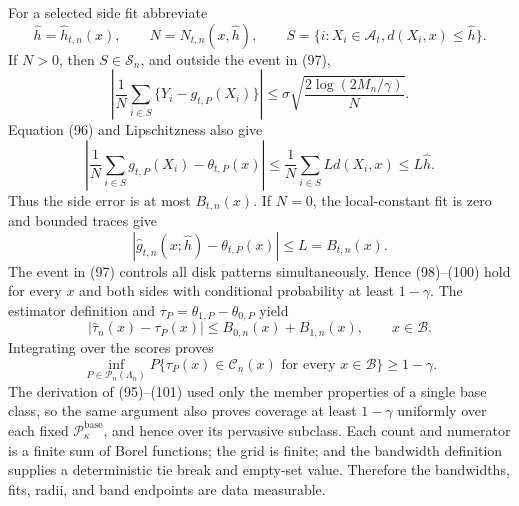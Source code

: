 For a selected side fit abbreviate
\[
 \widehat h=\widehat h_{t,n}(x),\qquad
 N=N_{t,n}(x,\widehat h),\qquad
 S=\{i:X_i\in\mathcal A_t, d(X_i,x)\le\widehat h\}.
\]
If \(N>0\), then \(S\in\mathscr S_n\), and outside the event in (97),
\[
 \left|\frac1N\sum_{i\in S}\{Y_i-g_{t,P}(X_i)\}\right|
 \le\sigma\sqrt{\frac{2\log(2M_n/\gamma)}N}.
 \tag{98}
\]
Equation (96) and Lipschitzness also give
\[
 \left|\frac1N\sum_{i\in S}g_{t,P}(X_i)-\theta_{t,P}(x)\right|
 \le\frac1N\sum_{i\in S}Ld(X_i,x)
 \le L\widehat h.
 \tag{99}
\]
Thus the side error is at most \(B_{t,n}(x)\).  If \(N=0\), the
local-constant fit is zero and bounded traces give
\[
 |\widehat g_{t,n}(x;\widehat h)-\theta_{t,P}(x)|
 \le L=B_{t,n}(x).
 \tag{100}
\]
The event in (97) controls all disk patterns simultaneously.  Hence
(98)--(100) hold for every \(x\) and both sides with conditional
probability at least \(1-\gamma\).  The estimator definition and
\(\tau_P=\theta_{1,P}-\theta_{0,P}\) yield
\[
 |\widehat\tau_n(x)-\tau_P(x)|
 \le B_{0,n}(x)+B_{1,n}(x),
 \qquad x\in\mathcal B.
 \tag{101}
\]
Integrating over the scores proves
\[
 \inf_{P\in\mathcal P_n(\Lambda_n)}
 P\{\tau_P(x)\in\mathcal C_n(x)\text{ for every }x\in\mathcal B\}
 \ge1-\gamma.
 \tag{102}
\]
The derivation of (95)--(101) used only the member properties of a single
base class, so the same argument also proves coverage at least
\(1-\gamma\) uniformly over each fixed
\(\mathcal P_\kappa^{\mathrm{base}}\), and hence over its pervasive
subclass.
Each count and numerator is a finite sum of Borel functions; the grid is
finite; and the bandwidth definition supplies a deterministic tie break
and empty-set value.  Therefore the bandwidths, fits, radii, and band
endpoints are data measurable.

